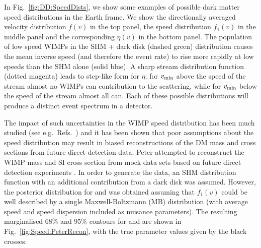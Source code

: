 In Fig.~\ref{fig:DD:SpeedDists}, we show some examples of possible dark matter speed distributions in the Earth frame. We show the directionally averaged velocity distribution $f(v)$ in the top panel, the speed distribution $f_1(v)$ in the middle panel and the corresponding $\eta(v)$ in the bottom panel. The population of low speed WIMPs in the SHM + dark disk (dashed green) distribution causes the mean inverse speed (and therefore the event rate) to rise more rapidly at low speeds than the SHM alone (solid blue). A sharp stream distribution function (dotted magenta) leads to step-like form for $\eta$; for $\vmin$ above the speed of the stream almost no WIMPs can contribution to the scattering, while for $\vmin$ below the speed of the stream almost all can. Each of these possible distributions will produce a distinct event spectrum in a detector.


The impact of such uncertainties in the WIMP speed distribution has been much studied (see e.g.\ Refs.~\cite{Green:2010, Peter:2011, Fairbairn:2012}) and it has been shown that poor assumptions about the speed distribution may result in biased reconstructions of the DM mass and cross sections from future direct detection data. Peter attempted to reconstruct the WIMP mass and SI cross section from mock data sets based on future direct detection experiments \cite{Peter:2011}. In order to generate the data, an SHM distribution function with an additional contribution from a dark disk was assumed. However, the posterior distribution for \mchi and \sigmapsi was obtained assuming that $f_1(v)$ could be well described by a single Maxwell-Boltzmann (MB) distribution (with average speed and speed dispersion included as nuisance parameters). The resulting marginalised 68\% and 95\% contours for \mchi and \sigmapsi are shown in Fig.~\ref{fig:Speed:PeterRecon}, with the true parameter values given by the black crosses.

